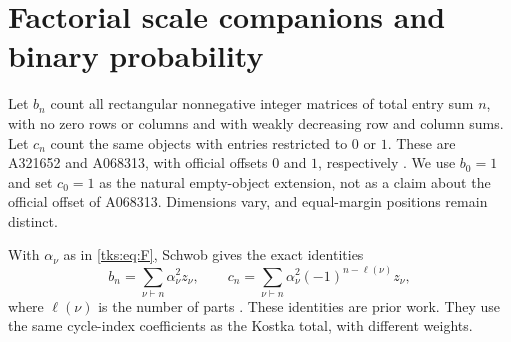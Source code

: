 \section{Factorial scale companions and binary probability}\label{tks:sec:companions}
Let $b_n$ count all rectangular nonnegative integer matrices of total entry sum $n$, with no zero rows or columns and with weakly decreasing row and column sums. Let $c_n$ count the same objects with entries restricted to $0$ or $1$. These are A321652 and A068313, with official offsets $0$ and $1$, respectively \cite{A321652,A068313}. We use $b_0=1$ and set $c_0=1$ as the natural empty-object extension, not as a claim about the official offset of A068313. Dimensions vary, and equal-margin positions remain distinct.

With $\alpha_\nu$ as in \eqref{tks:eq:F}, Schwob gives the exact identities
\begin{equation}\label{tks:eq:companionexact}
b_n=\sum_{\nu\vdash n}\alpha_\nu^2z_\nu,\qquad
c_n=\sum_{\nu\vdash n}\alpha_\nu^2(-1)^{n-\ell(\nu)}z_\nu,
\end{equation}
where $\ell(\nu)$ is the number of parts \cite[\S4.3, (4.9), (4.11)]{Schwob}. These identities are prior work. They use the same cycle-index coefficients as the Kostka total, with different weights.

